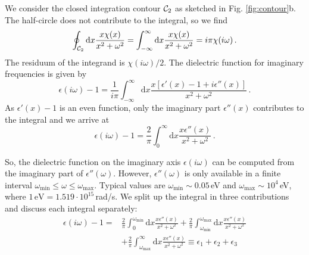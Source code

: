 \documentclass[twocolumn,superscriptaddress,pre]{revtex4-1}
\begin{document}
We consider the closed integration contour ${\cal C}_2$ as sketched in Fig.
\ref{fig:contour}b. The half-circle does not contribute to the integral, so we
find
\begin{equation}
\oint_{{\cal C}_2} \mathrm{d}x \frac{x\chi(x)}{x^2+\omega^2} = \int_{-\infty}^\infty\mathrm{d}x \frac{x \chi(x)}{x^2+\omega^2} = i\pi \chi(i\omega) \,.
\end{equation}
The residuum of the integrand is $\chi(i\omega)/2$. The dielectric function for imaginary frequencies
is given by
\begin{equation}
\epsilon(i\omega)-1 = \frac{1}{i\pi} \int_{-\infty}^\infty\mathrm{d}x \frac{x \left[\epsilon'(x)-1 + i\epsilon''(x)\right]}{x^2+\omega^2} \,.
\end{equation}
As $\epsilon'(x)-1$ is an even function, only the imaginary part $\epsilon''(x)$ contributes to the integral and we arrive at
\begin{equation}
\epsilon(i\omega)-1 = \frac{2}{\pi} \int_0^\infty\mathrm{d}x \frac{x \epsilon''(x)}{x^2+\omega^2} \,.
\end{equation}

So, the dielectric function on the imaginary axis $\epsilon(i\omega)$ can be
computed from the imaginary part of $\epsilon''(\omega)$. However,
$\epsilon''(\omega)$ is only available in a finite interval
$\omega_\mathrm{min} \le \omega \le \omega_\mathrm{max}$. Typical values are $\omega_\mathrm{min} \sim 0.05\,$eV
and $\omega_\mathrm{max} \sim 10^4\,$eV, where $1\,\mathrm{eV}=1.519\cdot10^{15}\,$rad/s.
We split up the
integral in three contributions and discuss each integral separately:
\begin{align}
\nonumber
\epsilon(i\omega)-1 =&
\frac{2}{\pi} \int_0^{\omega_\mathrm{min}} \mathrm{d}x \frac{x\epsilon''(x)}{x^2+\omega^2} +
\frac{2}{\pi} \int_{\omega_\mathrm{min}}^{\omega_\mathrm{max}} \mathrm{d}x \frac{x\epsilon''(x)}{x^2+\omega^2} \\
&+\frac{2}{\pi} \int_{\omega_\mathrm{max}}^\infty \mathrm{d}x \frac{x\epsilon''(x)}{x^2+\omega^2} \equiv \epsilon_1 + \epsilon_2 + \epsilon_3
\end{align}
\end{document}
